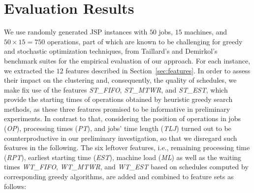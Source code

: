 \documentclass[runningheads]{llncs}
\newcommand{\stest}{\textit{ST\_EST}\xspace}
\newcommand{\stmtwr}{\textit{ST\_MTWR}\xspace}
\newcommand{\stfifo}{\textit{ST\_FIFO}\xspace}
\newcommand{\wtest}{\textit{WT\_EST}\xspace}
\newcommand{\wtmtwr}{\textit{WT\_MTWR}\xspace}
\newcommand{\wtfifo}{\textit{WT\_FIFO}\xspace}
\begin{document}
\section{Evaluation Results}
\label{sec:eval}
We use randomly generated JSP instances
with $50$ jobs, $15$ machines, and $50\times 15=750$ operations,
part of which are known to be challenging for greedy and stochastic optimization techniques,
from Taillard's and Demirkol's benchmark suites \cite{taillard1993benchmarks,demirkol1998benchmarks} for the empirical evaluation of our approach.
For each instance, we extracted the $12$ features described in Section~\ref{sec:features}. In order to assess their impact %
on the clustering and, consequently, the quality of schedules, we make fix use of the features \stfifo, \stmtwr, and \stest, which provide the starting times of operations obtained by
heuristic greedy search methods, as these three features promised to be informative
in preliminary experiments.
In contrast to that, considering the position of operations in jobs (\textit{OP}),
processing times (\textit{PT}), and jobs' time length (\textit{TLJ})
turned out to be counterproductive in our preliminary investigation,
so that we disregard such features in the following.
The six leftover features, i.e., remaining processing time (\textit{RPT}),
earliest starting time (\textit{EST}), machine load (\textit{ML})
as well as the waiting times \wtfifo, \wtmtwr, and \wtest
based on schedules computed by corresponding greedy algorithms,
are added and combined to feature sets as follows:
\end{document}
